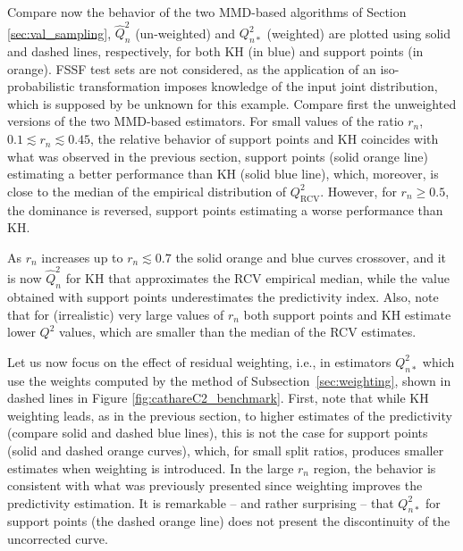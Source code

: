 Compare now the behavior of the two MMD-based algorithms of Section \ref{sec:val_sampling}, $\widehat Q^2_n$ (un-weighted) and $Q_{n*}^2$ (weighted) are plotted using solid and dashed lines, respectively, for both KH (in blue) and support points (in orange). 
FSSF test sets are not considered, as the application of an iso-probabilistic transformation imposes knowledge of the input joint distribution, which is supposed by be unknown for this example. 
Compare first the unweighted versions of the two MMD-based estimators. 
For small values of the ratio $r_n$, $0.1 \lesssim r_n \lesssim 0.45$, the relative behavior of support points and KH coincides with what was observed in the previous section, 
support points (solid orange line) estimating a better performance than KH (solid blue line), which, moreover, is close to the median of the empirical distribution of $Q^2_{\mathrm{RCV}}$. 
However, for $r_n \geq 0.5$, the dominance is reversed, support points estimating a worse performance than KH. 

As $r_n$ increases up to $r_n \lesssim 0.7$ the solid orange and blue curves crossover, and it is now $\widehat Q^2_n$ for KH that approximates the RCV empirical median, while the value obtained with support points underestimates the predictivity index. 
Also, note that for (irrealistic) very large values of $r_n$ both support points and KH estimate lower $Q^2$ values, which are smaller than the median of the RCV estimates.

Let us now focus on the effect of residual weighting, i.e., in estimators $Q_{n*}^2$ which use the weights computed by the method of Subsection~\ref{sec:weighting}, shown in dashed lines in Figure \ref{fig:cathareC2_benchmark}. 
First, note that while KH weighting leads, as in the previous section, to higher estimates of the predictivity (compare solid and dashed blue lines), this is not the case for support points (solid and dashed orange curves), which, for small split ratios, produces smaller estimates when weighting is introduced. 
In the large $r_n$ region, the behavior is consistent with what was previously presented since weighting improves the predictivity estimation. 
It is remarkable -- and rather surprising -- that $Q_{n*}^2$ for support points (the dashed orange line) does not present the discontinuity of the uncorrected curve. 

